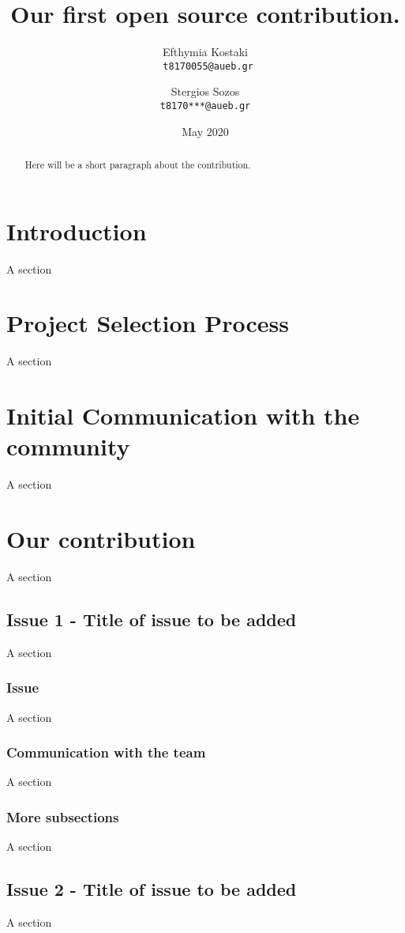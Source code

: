 \documentclass{article}
\title{Our first open source contribution.}
\author{Efthymia Kostaki \\
	 \texttt{ t8170055@aueb.gr}
	 \and
	 Stergios Sozos \\
 	 \texttt{t8170***@aueb.gr}
}
\date{May 2020}
\begin{document}
\maketitle

\begin{abstract}
Here will be a short paragraph about the contribution.
\end{abstract}

\section*{Introduction}
A section

\section{Project Selection Process}
A section

\section{Initial Communication with the community}
A section

\section{Our contribution}
A section

\subsection{Issue 1 - Title of issue to be added}
A section

\subsubsection{Issue}
A section

\subsubsection{Communication with the team}
A section

\subsubsection{More subsections}
A section

\subsection{Issue 2 - Title of issue to be added}
A section
\end{document}
